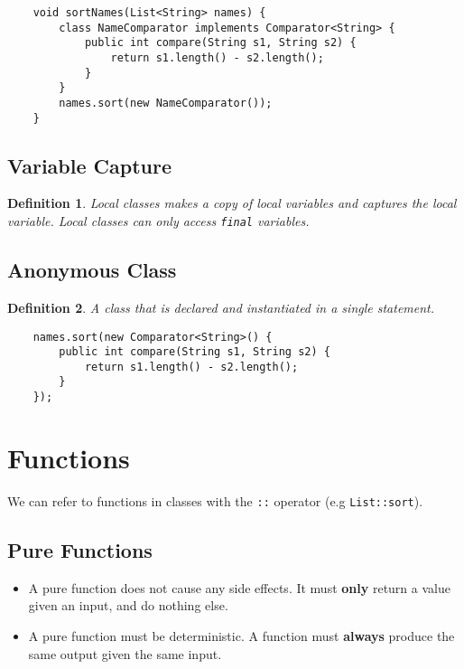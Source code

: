 \documentclass[10pt,landscape,a4paper]{article}
\newtheorem{definition}{Definition}[section]
\begin{document}
\begin{multicols*}{4}
\begin{lstlisting}
    void sortNames(List<String> names) {
        class NameComparator implements Comparator<String> {
            public int compare(String s1, String s2) {
                return s1.length() - s2.length();
            }
        }
        names.sort(new NameComparator());
    }
\end{lstlisting}

\subsection{Variable Capture}
\begin{definition}
    Local classes makes a copy of local variables and captures the local variable. Local classes can only access \texttt{final} variables.
\end{definition}

\subsection{Anonymous Class}
\begin{definition}
    A class that is declared and instantiated in a single statement.
\end{definition}

\begin{lstlisting}
    names.sort(new Comparator<String>() {
        public int compare(String s1, String s2) {
            return s1.length() - s2.length();
        }
    });
\end{lstlisting}

\section{Functions}
We can refer to functions in classes with the \texttt{::} operator (e.g \texttt{List::sort}).
\subsection{Pure Functions}
\begin{itemize}
    \item A pure function does not cause any side effects. It must \textbf{only} return a value given an input, and do nothing else.
    \item A pure function must be deterministic. A function must \textbf{always} produce the same output given the same input.
\end{itemize}


\end{multicols*}
\end{document}
